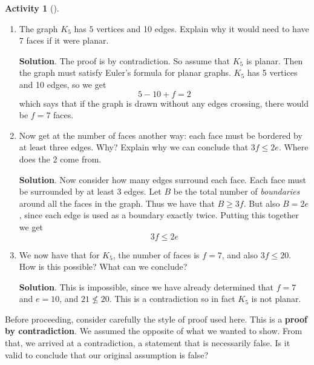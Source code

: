 \documentclass[10pt,]{book}
\newcommand{\terminology}[1]{\textbf{#1}}
\theoremstyle{plain}
\theoremstyle{definition}
\theoremstyle{definition}
\theoremstyle{definition}
\newtheorem{activity}[project]{Activity}
\numberwithin{equation}{chapter}
\begin{document}
\begin{activity}[]\label{activity-22}
\leavevmode%
\begin{enumerate}[font=\bfseries,label=(\alph*),ref=\alph*]
\item\label{task-34} \hypertarget{p-268}{}%
The graph \(K_5\) has \(5\) vertices and 10 edges.  Explain why it would need to have \(7\) faces if it were planar.%
\par\smallskip%
\noindent\textbf{Solution}.\hypertarget{solution-11}{}\quad%
\hypertarget{p-269}{}%
The proof is by contradiction. So assume that \(K_5\) is planar. Then the graph must satisfy Euler's formula for planar graphs. \(K_5\) has 5 vertices and 10 edges, so we get%
\begin{equation*}
5 - 10 + f = 2
\end{equation*}
which says that if the graph is drawn without any edges crossing, there would be \(f = 7\) faces.%
\item\label{task-35} \hypertarget{p-270}{}%
Now get at the number of faces another way: each face must be bordered by at least three edges.  Why?  Explain why we can conclude that \(3f \le 2e\).  Where does the 2 come from.%
\par\smallskip%
\noindent\textbf{Solution}.\hypertarget{solution-12}{}\quad%
\hypertarget{p-271}{}%
Now consider how many edges surround each face. Each face must be surrounded by at least 3 edges. Let \(B\) be the total number of \emph{boundaries} around all the faces in the graph. Thus we have that \(B \ge 3f\). But also \(B = 2e\), since each edge is used as a boundary exactly twice. Putting this together we get%
\begin{equation*}
3f \le 2e
\end{equation*}
%
\item\label{task-36} \hypertarget{p-272}{}%
We now have that for \(K_5\), the number of faces is \(f = 7\), and also \(3f \le 20\).  How is this possible?  What can we conclude?%
\par\smallskip%
\noindent\textbf{Solution}.\hypertarget{solution-13}{}\quad%
\hypertarget{p-273}{}%
This is impossible, since we have already determined that \(f = 7\) and \(e = 10\), and \(21 \not\le 20\). This is a contradiction so in fact \(K_5\) is not planar.%
\end{enumerate}
\end{activity}
\hypertarget{p-274}{}%
Before proceeding, consider carefully the style of proof used here.  This is a \terminology{proof by contradiction}.  We assumed the opposite of what we wanted to show.  From that, we arrived at a contradiction, a statement that is necessarily false.  Is it valid to conclude that our original assumption is false?%
\end{document}
